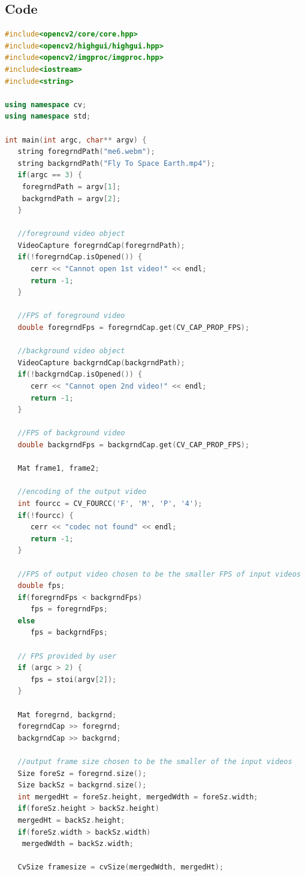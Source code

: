\documentclass[12pt]{article}
\begin{document}
\subsection{Code}
\begin{lstlisting}[language=c++]
#include<opencv2/core/core.hpp>
#include<opencv2/highgui/highgui.hpp>
#include<opencv2/imgproc/imgproc.hpp>
#include<iostream>
#include<string>

using namespace cv;
using namespace std;

int main(int argc, char** argv) {
   string foregrndPath("me6.webm"); 
   string backgrndPath("Fly To Space Earth.mp4");
   if(argc == 3) {
    foregrndPath = argv[1];
    backgrndPath = argv[2]; 
   }

   //foreground video object
   VideoCapture foregrndCap(foregrndPath);
   if(!foregrndCap.isOpened()) {
      cerr << "Cannot open 1st video!" << endl;
      return -1;
   }
   
   //FPS of foreground video
   double foregrndFps = foregrndCap.get(CV_CAP_PROP_FPS);

   //background video object
   VideoCapture backgrndCap(backgrndPath);
   if(!backgrndCap.isOpened()) {
      cerr << "Cannot open 2nd video!" << endl;
      return -1;
   }

   //FPS of background video
   double backgrndFps = backgrndCap.get(CV_CAP_PROP_FPS);
   
   Mat frame1, frame2;
   
   //encoding of the output video
   int fourcc = CV_FOURCC('F', 'M', 'P', '4');
   if(!fourcc) {
      cerr << "codec not found" << endl;
      return -1;
   }
      
   //FPS of output video chosen to be the smaller FPS of input videos
   double fps;
   if(foregrndFps < backgrndFps) 
      fps = foregrndFps;   
   else
      fps = backgrndFps;

   // FPS provided by user 
   if (argc > 2) {
      fps = stoi(argv[2]);
   }

   Mat foregrnd, backgrnd;
   foregrndCap >> foregrnd;
   backgrndCap >> backgrnd;
   
   //output frame size chosen to be the smaller of the input videos
   Size foreSz = foregrnd.size();
   Size backSz = backgrnd.size();
   int mergedHt = foreSz.height, mergedWdth = foreSz.width;
   if(foreSz.height > backSz.height) 
   mergedHt = backSz.height;
   if(foreSz.width > backSz.width)
    mergedWdth = backSz.width;

   CvSize framesize = cvSize(mergedWdth, mergedHt);


\end{lstlisting}
\end{document}
